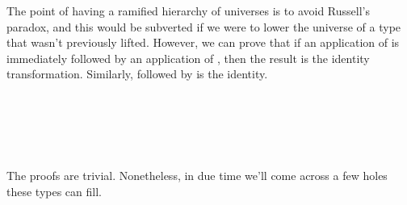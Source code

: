 The point of having a ramified hierarchy of universes is to avoid Russell's paradox, and this would be subverted if we were to lower the universe of a type that wasn't previously lifted.  However, we can prove that if an application of  is immediately followed by an application of , then the result is the identity transformation. Similarly,  followed by  is the identity.
\ccpad
\begin{code}%
\>[0]\AgdaSpace{}%
\AgdaSymbol{:}\AgdaSpace{}%
\AgdaSymbol{\{}\AgdaSpace{}%
\AgdaSpace{}%
\AgdaSymbol{:}\AgdaSpace{}%
\AgdaSymbol{\}\{}\AgdaSpace{}%
\AgdaSymbol{:}\AgdaSpace{}%
\AgdaSpace{}%
\AgdaSymbol{\}}\AgdaSpace{}%
\AgdaSpace{}%
\AgdaSpace{}%
\AgdaSpace{}%
\AgdaSpace{}%
\AgdaSpace{}%
\AgdaSpace{}%
\AgdaSymbol{(}\AgdaSymbol{\{}\AgdaSymbol{\}}\AgdaSpace{}%
\AgdaSymbol{)}\<%
\\
\>[0]\AgdaSpace{}%
\AgdaSymbol{=}\AgdaSpace{}%
\<%
\\
%
\\[\AgdaEmptyExtraSkip]%
\>[0]\AgdaSpace{}%
\AgdaSymbol{:}\AgdaSpace{}%
\AgdaSymbol{\{}\AgdaSpace{}%
\AgdaSpace{}%
\AgdaSymbol{:}\AgdaSpace{}%
\AgdaSymbol{\}\{}\AgdaSpace{}%
\AgdaSymbol{:}\AgdaSpace{}%
\AgdaSpace{}%
\AgdaSymbol{\}}\AgdaSpace{}%
\AgdaSpace{}%
\AgdaSymbol{\{}\AgdaSymbol{\}\{}\AgdaSymbol{\}}\AgdaSpace{}%
\AgdaSpace{}%
\AgdaSpace{}%
\AgdaSpace{}%
\AgdaSpace{}%
\<%
\\
\>[0]\AgdaSpace{}%
\AgdaSymbol{=}\AgdaSpace{}%
\<%
\end{code}
\ccpad
The proofs are trivial. Nonetheless, in due time we'll come across a few holes these types can fill.





